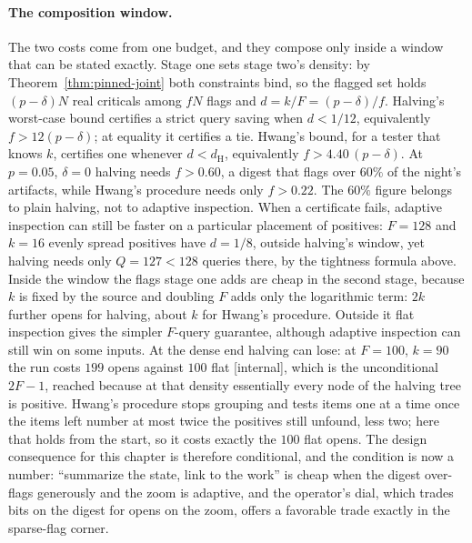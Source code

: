 \documentclass[11pt,a4paper]{article}
\theoremstyle{definition}
\theoremstyle{plain}
\begin{document}
\paragraph{The composition window.} The two costs come from one budget, and
they compose only inside a window that can be stated exactly. Stage one sets stage
two's density: by Theorem~\ref{thm:pinned-joint} both constraints bind, so the
flagged set holds $(p-\delta)N$ real criticals among $fN$ flags and
$d=k/F=(p-\delta)/f$. Halving's worst-case bound certifies a strict query
saving when $d<1/12$, equivalently $f>12(p-\delta)$; at equality it certifies a
tie. Hwang's bound, for a tester that knows $k$, certifies one whenever
$d<d_{\mathrm{H}}$, equivalently $f>4.40\,(p-\delta)$. At $p{=}0.05$, $\delta{=}0$
halving needs $f>0.60$, a digest that flags over $60\%$ of the night's artifacts,
while Hwang's procedure needs only $f>0.22$. The $60\%$ figure belongs to plain
halving, not to adaptive inspection. When a certificate fails, adaptive
inspection can still be faster on a particular placement of positives: $F=128$
and $k=16$ evenly spread positives have $d=1/8$, outside halving's window, yet
halving needs only $Q=127<128$ queries there, by the tightness formula above.
Inside the window the flags stage one adds are cheap in the second stage,
because $k$ is fixed by the source and doubling $F$ adds only the logarithmic
term: $2k$ further opens for halving, about $k$ for Hwang's procedure.
Outside it flat inspection gives the simpler $F$-query guarantee, although
adaptive inspection can still win on some inputs. At the dense end halving can
lose: at $F{=}100$, $k{=}90$ the run costs $199$ opens against $100$ flat
[internal], which is the unconditional $2F-1$, reached because at that density
essentially every node of the halving tree is positive. Hwang's procedure stops
grouping and tests items one at a time once the items left number at most twice
the positives still unfound, less two; here that holds from the start, so it
costs exactly the $100$ flat opens. The design consequence for this chapter is
therefore conditional, and the condition is now a number: ``summarize the state,
link to the work'' is cheap when the digest over-flags generously and the zoom is
adaptive, and the operator's dial, which trades bits on the digest for opens on
the zoom, offers a favorable trade exactly in the sparse-flag corner.
\end{document}
